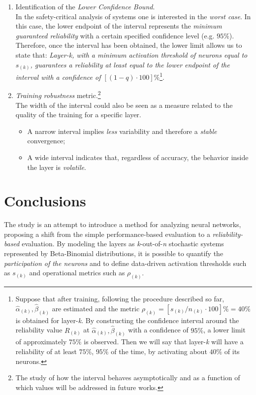 \documentclass[10pt]{article} %
\begin{document}
\begin{enumerate}
    \item Identification of the \textit{Lower Confidence Bound}. \\
    In the safety-critical analysis of systems one is interested in the \textit{worst case}. In this case, the lower endpoint of the interval represents the \textit{minimum guaranteed reliability} with a certain specified confidence level (e.g. $95\%$). Therefore, once the interval has been obtained, the lower limit allows us to state that: \textit{Layer-k, with a minimum activation threshold of neurons equal to $s_{(k)}$, guarantees a reliability at least equal to the lower endpoint of the interval with a confidence of $[(1-q)\cdot100]\%$}\footnote{Suppose that after training, following the procedure described so far, $\hat{\alpha}_{(k)}, \hat{\beta}_{(k)}$ are estimated and the metric $\rho_{(k)} = [s_{(k)}/{n_{(k)}}\cdot100]\% = 40\%$ is obtained for layer-\textit{k}. By constructing the confidence interval around the reliability value $R_{(k)}$ at $\hat{\alpha}_{(k)}, \hat{\beta}_{(k)}$ with a confidence of $95\%$, a lower limit of approximately $75\%$ is observed. Then we will say that layer-\textit{k} will have a reliability of at least $75\%$, $95\%$ of the time, by activating about $40\%$ of its neurons.}.
    
    \item \textit{Training robustness} metric.\footnote{The study of how the interval behaves asymptotically and as a function of which values will be addressed in future works.}\\
    The width of the interval could also be seen as a measure related to the quality of the training for a specific layer.
    \begin{itemize}
        \item A narrow interval implies \textit{less} variability and therefore a \textit{stable} convergence;
        \item A wide interval indicates that, regardless of accuracy, the behavior inside the layer is \textit{volatile}.
    \end{itemize}
\end{enumerate}

\section{Conclusions}
The study is an attempt to introduce a method for analyzing neural networks, proposing a shift from the simple performance-based evaluation to a \textit{reliability-based} evaluation. By modeling the layers as \textit{k}-out-of-\textit{n} stochastic systems represented by Beta-Binomial distributions, it is possible to quantify the \textit{participation of the neurons} and to define data-driven activation thresholds such as $s_{(k)}$ and operational metrics such as $\rho_{(k)}$.
\end{document}
